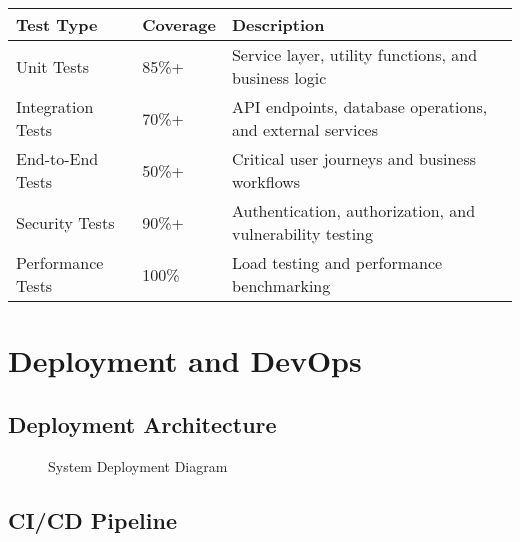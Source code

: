 \documentclass[12pt,a4paper]{article}
\begin{document}
\begin{longtable}{|p{3cm}|p{2cm}|p{9cm}|}
\hline
\textbf{Test Type} & \textbf{Coverage} & \textbf{Description} \\
\hline
Unit Tests & 85\%+ & Service layer, utility functions, and business logic \\
\hline
Integration Tests & 70\%+ & API endpoints, database operations, and external services \\
\hline
End-to-End Tests & 50\%+ & Critical user journeys and business workflows \\
\hline
Security Tests & 90\%+ & Authentication, authorization, and vulnerability testing \\
\hline
Performance Tests & 100\% & Load testing and performance benchmarking \\
\hline
\end{longtable}

\section{Deployment and DevOps}

\subsection{Deployment Architecture}

\begin{figure}[H]
\centering
{}
\caption{System Deployment Diagram}
\label{fig:deployment-diagram}
\end{figure}

\subsection{CI/CD Pipeline}
\end{document}
